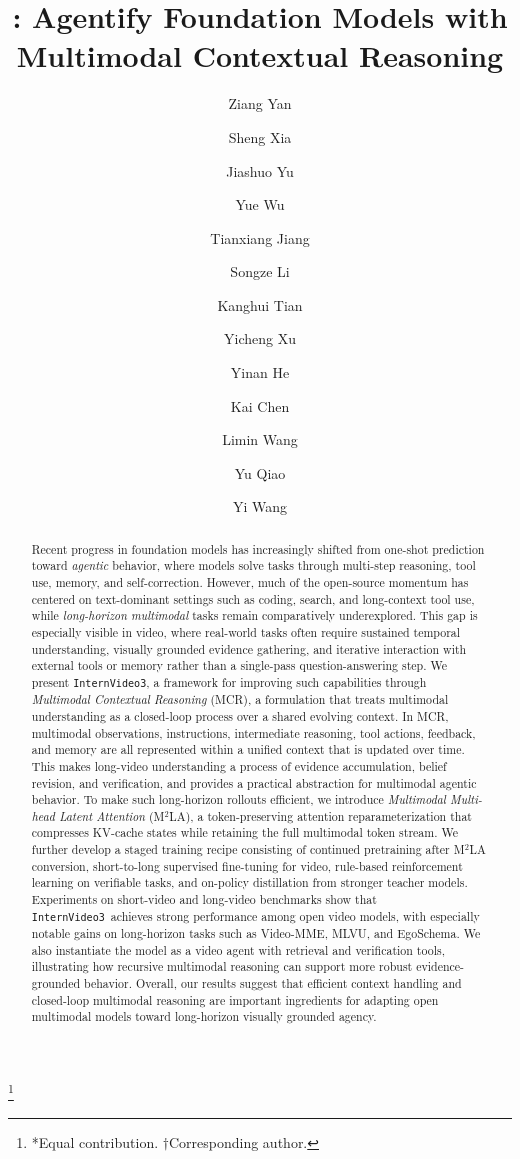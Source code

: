 \documentclass[11pt, letterpaper]{template}
\title{\name: Agentify Foundation Models with Multimodal Contextual Reasoning}
\author[1*]{Ziang Yan} \author[2,3*]{Sheng Xia} \author[1*]{Jiashuo Yu} \author[1*]{Yue Wu} \author[1]{Tianxiang Jiang} \author[1]{Songze Li} \author[1]{Kanghui Tian} \author[1]{Yicheng Xu} \author[1]{Yinan He} \author[1]{Kai Chen} \author[3,1]{Limin Wang} \author[1]{Yu Qiao} \author[1$\dagger$]{Yi Wang}
\affil[1]{Shanghai AI Laboratory} \affil[2]{Shanghai Innovation Institute}
\affil[3]{Nanjing University}
\theoremstyle{plain}
\theoremstyle{definition}
\theoremstyle{remark}
\newcommand{\name}{\texttt{InternVideo3}\xspace}
\newcommand{\blfootnote}[1]{%
  \begingroup
  \renewcommand\thefootnote{}\footnote{#1}%
  \addtocounter{footnote}{-1}%
  \endgroup
}
\begin{document}
\begin{abstract}
Recent progress in foundation models has increasingly shifted from one-shot prediction toward \emph{agentic} behavior, where models solve tasks through multi-step reasoning, tool use, memory, and self-correction. However, much of the open-source momentum has centered on text-dominant settings such as coding, search, and long-context tool use, while \emph{long-horizon multimodal} tasks remain comparatively underexplored. This gap is especially visible in video, where real-world tasks often require sustained temporal understanding, visually grounded evidence gathering, and iterative interaction with external tools or memory rather than a single-pass question-answering step.
We present \name, a framework for improving such capabilities through \emph{Multimodal Contextual Reasoning} (MCR), a formulation that treats multimodal understanding as a closed-loop process over a shared evolving context. In MCR, multimodal observations, instructions, intermediate reasoning, tool actions, feedback, and memory are all represented within a unified context that is updated over time. This makes long-video understanding a process of evidence accumulation, belief revision, and verification, and provides a practical abstraction for multimodal agentic behavior.
To make such long-horizon rollouts efficient, we introduce \emph{Multimodal Multi-head Latent Attention} (M$^2$LA), a token-preserving attention reparameterization that compresses KV-cache states while retaining the full multimodal token stream. We further develop a staged training recipe consisting of continued pretraining after M$^2$LA conversion, short-to-long supervised fine-tuning for video, rule-based reinforcement learning on verifiable tasks, and on-policy distillation from stronger teacher models.
Experiments on short-video and long-video benchmarks show that \name\ achieves strong performance among open video models, with especially notable gains on long-horizon tasks such as Video-MME, MLVU, and EgoSchema. We also instantiate the model as a video agent with retrieval and verification tools, illustrating how recursive multimodal reasoning can support more robust evidence-grounded behavior. Overall, our results suggest that efficient context handling and closed-loop multimodal reasoning are important ingredients for adapting open multimodal models toward long-horizon visually grounded agency.

\end{abstract}

\blfootnote{*Equal contribution. $\dagger$Corresponding author.}
\end{document}
